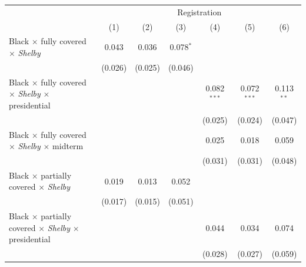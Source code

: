 
\begingroup
\centering
\begin{tabular}{lcccccc}
   \toprule
    & \multicolumn{6}{c}{Registration}\\
                                                                                       & (1)           & (2)           & (3)           & (4)           & (5)           & (6)\\  
   \midrule 
   Black $\times$ fully covered $\times$ \textit{Shelby}                               & 0.043         & 0.036         & 0.078$^{*}$   &               &               &   \\   
                                                                                       & (0.026)       & (0.025)       & (0.046)       &               &               &   \\   
   Black $\times$ fully covered $\times$ \textit{Shelby} $\times$ presidential         &               &               &               & 0.082$^{***}$ & 0.072$^{***}$ & 0.113$^{**}$\\   
                                                                                       &               &               &               & (0.025)       & (0.024)       & (0.047)\\   
   Black $\times$ fully covered $\times$ \textit{Shelby} $\times$ midterm              &               &               &               & 0.025         & 0.018         & 0.059\\   
                                                                                       &               &               &               & (0.031)       & (0.031)       & (0.048)\\   
   Black $\times$ partially covered $\times$ \textit{Shelby}                           & 0.019         & 0.013         & 0.052         &               &               &   \\   
                                                                                       & (0.017)       & (0.015)       & (0.051)       &               &               &   \\   
   Black $\times$ partially covered $\times$ \textit{Shelby} $\times$ presidential     &               &               &               & 0.044         & 0.034         & 0.074\\   
                                                                                       &               &               &               & (0.028)       & (0.027)       & (0.059)\\   

\end{tabular}
